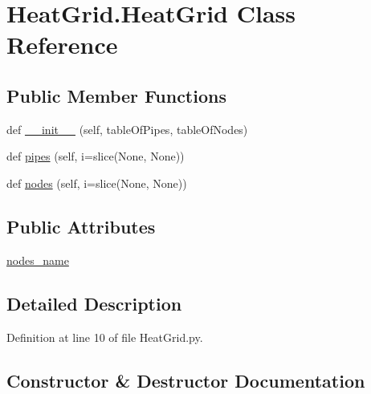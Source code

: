\hypertarget{class_heat_grid_1_1_heat_grid}{}\section{Heat\+Grid.\+Heat\+Grid Class Reference}
\label{class_heat_grid_1_1_heat_grid}
\subsection*{Public Member Functions}
\begin{DoxyCompactItemize}
\item 
def \hyperlink{class_heat_grid_1_1_heat_grid_a27cb2e55814a70836bfa545444e9e5bd}{\+\_\+\+\_\+init\+\_\+\+\_\+} (self, table\+Of\+Pipes, table\+Of\+Nodes)
\item 
def \hyperlink{class_heat_grid_1_1_heat_grid_af17f7454a1291bba202b45f49f62a483}{pipes} (self, i=slice(None, None))
\item 
def \hyperlink{class_heat_grid_1_1_heat_grid_aee9b2652e4a04ae68e3e2c4779364dda}{nodes} (self, i=slice(None, None))
\end{DoxyCompactItemize}
\subsection*{Public Attributes}
\begin{DoxyCompactItemize}
\item 
\hyperlink{class_heat_grid_1_1_heat_grid_a3611b66c8dfdfdd3e94db12e76cfe9b7}{nodes\+\_\+name}
\end{DoxyCompactItemize}


\subsection{Detailed Description}


Definition at line 10 of file Heat\+Grid.\+py.



\subsection{Constructor \& Destructor Documentation}
\mbox{\label{class_heat_grid_1_1_heat_grid_a27cb2e55814a70836bfa545444e9e5bd}} 
